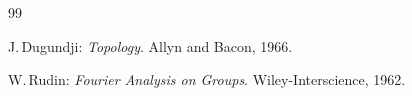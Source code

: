 \documentclass[11pt,twoside]{article}
\begin{document}
\vspace{8mm}
\begin{thebibliography}{99}

 J.\,Dugundji:
\textit{Topology}.
Allyn and Bacon, 1966.

 W.\,Rudin:
\textit{Fourier Analysis on Groups}.
Wiley-Interscience, 1962.

\end{thebibliography}

\end{document}
